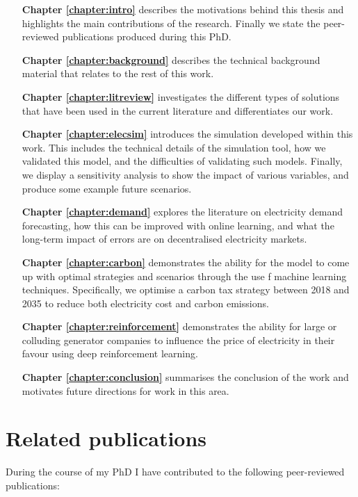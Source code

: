 \begin{itemize}[itemindent=3em]
	\item[\textbf{Chapter \ref{chapter:intro}}] describes the motivations behind this thesis and highlights the main contributions of the research. Finally we state the peer-reviewed publications produced during this PhD. 
	\item[\textbf{Chapter \ref{chapter:background}}] describes the technical background material that relates to the rest of this work.
	\item[\textbf{Chapter \ref{chapter:litreview}}] investigates the different types of solutions that have been used in the current literature and differentiates our work. 
	\item[\textbf{Chapter \ref{chapter:elecsim}}] introduces the simulation developed within this work. This includes the technical details of the simulation tool, how we validated this model, and the difficulties of validating such models. Finally, we display a sensitivity analysis to show the impact of various variables, and produce some example future scenarios.
	\item[\textbf{Chapter \ref{chapter:demand}}] explores the literature on electricity demand forecasting, how this can be improved with online learning, and what the long-term impact of errors are on decentralised electricity markets.
	\item[\textbf{Chapter \ref{chapter:carbon}}] demonstrates the ability for the model to come up with optimal strategies and scenarios through the use f machine learning techniques. Specifically, we optimise a carbon tax strategy between 2018 and 2035 to reduce both electricity cost and carbon emissions.
	\item[\textbf{Chapter \ref{chapter:reinforcement}}] demonstrates the ability for large or colluding generator companies to influence the price of  electricity in their favour using deep reinforcement learning.
	\item[\textbf{Chapter \ref{chapter:conclusion}}] summarises the conclusion of the work and motivates future directions for work in this area.
\end{itemize}




\section{Related publications}

During the course of my PhD I have contributed to the following peer-reviewed publications:	

